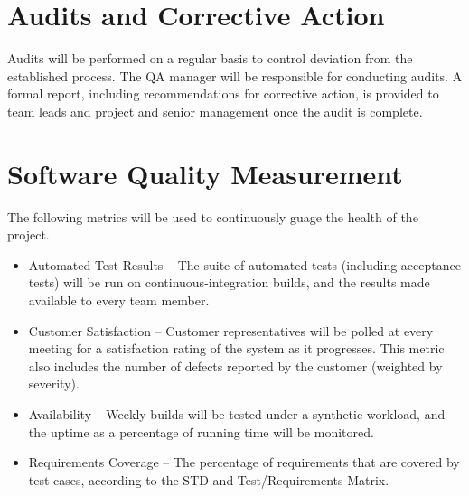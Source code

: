 \documentclass[11pt]{wacomepd}
\begin{document}
\chapter{Audits and Corrective Action}

Audits will be performed on a regular basis to control deviation from the established process.  The
QA manager will be responsible for conducting audits.  A formal report, including recommendations
for corrective action, is provided to team leads and project and senior management once the audit is
complete.



\chapter{Software Quality Measurement}
\label{metrics}

The following metrics will be used to continuously guage the health of the project.

\begin{itemize}
\item {\sc Automated Test Results} -- The suite of automated tests (including acceptance tests) will
  be run on continuous-integration builds, and the results made available to every team member.
\item {\sc Customer Satisfaction} -- Customer representatives will be polled at every meeting for a
  satisfaction rating of the system as it progresses.  This metric also includes the number of
  defects reported by the customer (weighted by severity).
\item {\sc Availability} -- Weekly builds will be tested under a synthetic workload, and the uptime
  as a percentage of running time will be monitored.
\item {\sc Requirements Coverage} -- The percentage of requirements that are covered by test cases,
  according to the STD and Test/Requirements Matrix.
\end{itemize}
\end{document}
